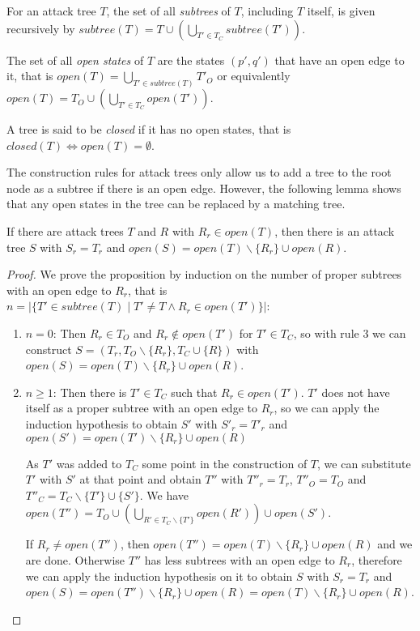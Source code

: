 \begin{definition}
  For an attack tree $T$, the set of all \emph{subtrees} of $T$,
  including $T$ itself, is given recursively by
  $subtree(T) = T ∪ \left(⋃_{T' ∈ T_C} subtree(T') \right)$.
  
  The set of all \emph{open states} of $T$ are the states $(p',q')$ that
  have an open edge to it, that is $open(T) = ⋃_{T' ∈ subtree(T)} T'_O$
  or equivalently $open(T) = T_O ∪ \left(⋃_{T' ∈ T_C} open(T') \right)$.
  
  A tree is said to be \emph{closed} if it has no open states, that is
  $closed(T) \iff open(T) = ∅$.
\end{definition}

The construction rules for attack trees only allow us to add a tree
to the root node as a subtree if there is an open edge.
However, the following lemma shows that any open states in the tree
can be replaced by a matching tree.

\begin{lemma}
  \label{lemma:tree-composition}
  If there are attack trees $T$ and $R$ with
  $R_r ∈ open(T)$,
  then there is an attack tree $S$ with
  $S_r = T_r$ and
  $open(S) = open(T) ∖ \{R_r\} ∪ open(R)$.
\end{lemma}
\begin{proof}
  We prove the proposition by induction on the number of proper subtrees
  with an open edge to $R_r$, that is
  $n = |\{ T' ∈ subtree(T) \mid T' ≠ T ∧ R_r ∈ open(T')\}|$:
  \begin{enumerate}
    \item $n = 0$:
      Then $R_r ∈ T_O$ and $R_r ∉ open(T')$ for $T' ∈ T_C$,
      so with rule 3 we can construct
      $S = (T_r, T_O ∖ \{R_r\}, T_C ∪ \{R\})$ with
      $open(S) = open(T) ∖ \{R_r\} ∪ open(R)$.
    \item $n ≥ 1$:
      Then there is $T' ∈ T_C$ such that $R_r ∈ open(T')$.
      $T'$ does not have itself as a proper subtree
      with an open edge to $R_r$, so we can apply
      the induction hypothesis to obtain
      $S'$ with $S'_r = T'_r$ and
      $open(S') = open(T') ∖ \{R_r\} ∪ open(R)$

      As $T'$ was added to $T_C$ some point in the construction of $T$,
      we can substitute $T'$ with $S'$ at that point and obtain
      $T''$ with $T''_r = T_r$, $T''_O = T_O$ and
      $T''_C = T_C ∖ \{T'\} ∪ \{S'\}$.
      We have $open(T'') = T_O ∪ \left(⋃_{R' ∈ T_C ∖ \{T'\} } open(R')\right) ∪ open(S')$.

      If $R_r ≠ open(T'')$, then $open(T'') = open(T) ∖ \{R_r\} ∪ open(R)$ and we are done.
      Otherwise $T''$ has less subtrees with an open edge to
      $R_r$, therefore we
      can apply the induction hypothesis on it to obtain
      $S$ with $S_r = T_r$ and
      $open(S) = open(T'') ∖ \{R_r\} ∪ open(R) = open(T) ∖ \{R_r\} ∪ open(R)$.
  \end{enumerate}
\end{proof}

